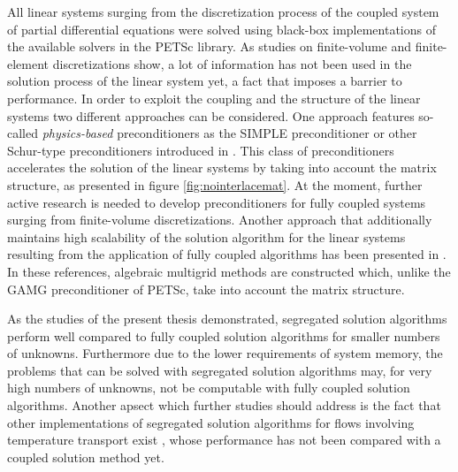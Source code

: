 All linear systems surging from the discretization process of the coupled system of partial differential equations were solved using black-box implementations of the available solvers in the PETSc library. As studies on finite-volume \cite{klaij13,darwish09,mangani14} and finite-element \cite{brown12,elman03,elman08,silvester01,turek02,mcinnes14} discretizations show, a lot of information has not been used in the solution process of the linear system yet, a fact that imposes a barrier to performance. In order to exploit the coupling and the structure of the linear systems two different approaches can be considered. One approach features so-called \emph{physics-based} preconditioners as the SIMPLE preconditioner or other Schur-type preconditioners introduced in \cite{klaij13,elman08}. This class of preconditioners accelerates the solution of the linear systems by taking into account the matrix structure, as presented in figure \ref{fig:nointerlacemat}. At the moment, further active research is needed to develop preconditioners for fully coupled systems surging from finite-volume discretizations. Another approach that additionally maintains high scalability of the solution algorithm for the linear systems resulting from the application of fully coupled algorithms has been presented in \cite{darwish09,mangani14}. In these references, algebraic multigrid methods are constructed which, unlike the GAMG preconditioner of PETSc, take into account the matrix structure.

As the studies of the present thesis demonstrated, segregated solution algorithms perform well compared to fully coupled solution algorithms for smaller numbers of unknowns. Furthermore due to the lower requirements of system memory, the problems that can be solved with segregated solution algorithms may, for very high numbers of unknowns, not be computable with fully coupled solution algorithms. Another apsect which further studies should address is the fact that other implementations of segregated solution algorithms for flows involving temperature transport exist \cite{liu84,oliveira01}, whose performance has not been compared with a coupled solution method yet.

